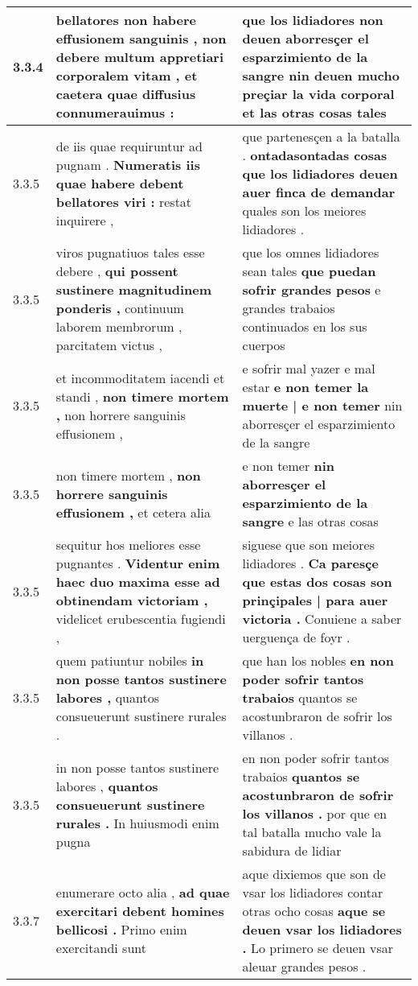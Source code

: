\begin{tabular}{|p{1cm}|p{6.5cm}|p{6.5cm}|}
3.3.4 & bellatores non habere effusionem sanguinis , \textbf{ non debere multum appretiari corporalem vitam , } et caetera quae diffusius connumerauimus : & que los lidiadores non deuen aborresçer el esparzimiento de la sangre \textbf{ nin deuen mucho preçiar la vida corporal } et las otras cosas tales \\\hline
3.3.5 & de iis quae requiruntur ad pugnam . \textbf{ Numeratis iis quae habere debent bellatores viri : } restat inquirere , & que partenesçen a la batalla . \textbf{ ontadasontadas cosas que los lidiadores deuen auer finca de demandar } quales son los meiores lidiadores . \\\hline
3.3.5 & viros pugnatiuos tales esse debere , \textbf{ qui possent sustinere magnitudinem ponderis , } continuum laborem membrorum , parcitatem victus , & que los omnes lidiadores sean tales \textbf{ que puedan sofrir grandes pesos } e grandes trabaios continuados en los sus cuerpos \\\hline
3.3.5 & et incommoditatem iacendi et standi , \textbf{ non timere mortem , } non horrere sanguinis effusionem , & e sofrir mal yazer e mal estar \textbf{ e non temer la muerte | e non temer } nin aborresçer el esparzimiento de la sangre \\\hline
3.3.5 & non timere mortem , \textbf{ non horrere sanguinis effusionem , } et cetera alia & e non temer \textbf{ nin aborresçer el esparzimiento de la sangre } e las otras cosas \\\hline
3.3.5 & sequitur hos meliores esse pugnantes . \textbf{ Videntur enim haec duo maxima esse ad obtinendam victoriam , } videlicet erubescentia fugiendi , & siguese que son meiores lidiadores . \textbf{ Ca paresçe que estas dos cosas son prinçipales | para auer victoria . } Conuiene a saber uerguença de foyr . \\\hline
3.3.5 & quem patiuntur nobiles \textbf{ in non posse tantos sustinere labores , } quantos consueuerunt sustinere rurales . & que han los nobles \textbf{ en non poder sofrir tantos trabaios } quantos se acostunbraron de sofrir los villanos . \\\hline
3.3.5 & in non posse tantos sustinere labores , \textbf{ quantos consueuerunt sustinere rurales . } In huiusmodi enim pugna & en non poder sofrir tantos trabaios \textbf{ quantos se acostunbraron de sofrir los villanos . } por que en tal batalla mucho vale la sabidura de lidiar \\\hline
3.3.7 & enumerare octo alia , \textbf{ ad quae exercitari debent homines bellicosi . } Primo enim exercitandi sunt & aque dixiemos que son de vsar los lidiadores contar otras ocho cosas \textbf{ aque se deuen vsar los lidiadores . } Lo primero se deuen vsar aleuar grandes pesos . \\\hline

\end{tabular}
